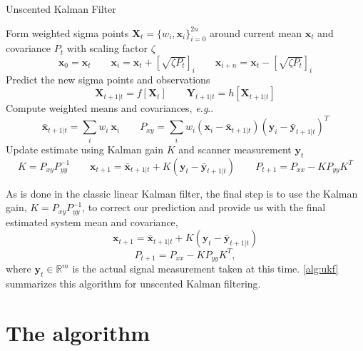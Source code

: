 \documentclass[final,hyperref]{gatech-thesis}
\makeatletter
\renewcommand{\v}[1]{\ensuremath{\mathbf #1}\xspace}
\DeclareRobustCommand\onedot{\futurelet\@let@token\@onedot}
\def\@onedot{\ifx\@let@token.\else.\null\fi\xspace}
\newcommand{\eg}{\textit{e.g}\onedot}
\newcommand{\R}{\ensuremath{\mathbb R}}
\newcommand{\x}{\v x}
\newcommand{\y}{\v y}
\newcommand{\X}{\v X}
\newcommand{\Y}{\v Y}
\makeatother
\begin{document}
\begin{algorithm}[t]
  \setlength\abovedisplayskip{2pt}
  \setlength\belowdisplayskip{2pt}
  \caption{Unscented Kalman Filter}
  \label{alg:ukf}
  \begin{algorithmic}[1]
    \STATE Form weighted sigma points $\X_t=\{w_i, \x_i\}_{i=0}^{2n}$ around
    current mean $\x_t$ and covariance $P_t$ with scaling factor $\zeta$
    \begin{equation*}
      \x_0 = \x_t
      \qquad
      \x_i    = \x_t + [\sqrt{\zeta P_t}]_i
      \qquad
      \x_{i+n} = \x_t - [\sqrt{\zeta P_t}]_i
    \end{equation*}
    \STATE Predict the new sigma points and observations
    \begin{equation*}
      \X_{t+1|t} = f[\X_t]   \qquad   \Y_{t+1|t} = h[\X_{t+1|t}]
    \end{equation*}
    \STATE Compute weighted means and covariances, \eg
    \begin{equation*}
      \bar{\x}_{t+1|t} = \sum_i w_i ~ \x_i
      \qquad
      P_{xy} = \sum_i w_i (\x_i - \bar{\x}_{t+1|t})(\y_i - \bar{\y}_{t+1|t})^T
    \end{equation*}
    \STATE Update estimate using Kalman gain $K$ and scanner measurement
    $\y_t$
    \begin{equation*}
      K = P_{xy}P_{yy}^{-1}
      \qquad
      \x_{t+1} = \bar{\x}_{t+1|t} + K(\y_t - \bar{\y}_{t+1|t})
      \qquad
      P_{t+1} = P_{xx} - K P_{yy} K^T
    \end{equation*}
  \end{algorithmic}
\end{algorithm}
As is done in the classic linear Kalman filter, the final step is to use the
Kalman gain, $K = P_{xy}P_{yy}^{-1}$, to correct our prediction and provide us
with the final estimated system mean and covariance,
\begin{equation} \label{eq:x_}
  \x_{t+1} = \bar{\x}_{t+1|t} + K(\y_t - \bar{\y}_{t+1|t})
\end{equation}
\begin{equation} \label{eq:P_}
  P_{t+1} = P_{xx} - K P_{yy} K^T ,
\end{equation}
where $\y_t \in \R^m$ is the actual signal measurement taken at this time.
\autoref{alg:ukf} summarizes this algorithm for unscented Kalman filtering.



\section{The algorithm} \label{sec:alg}
\end{document}
